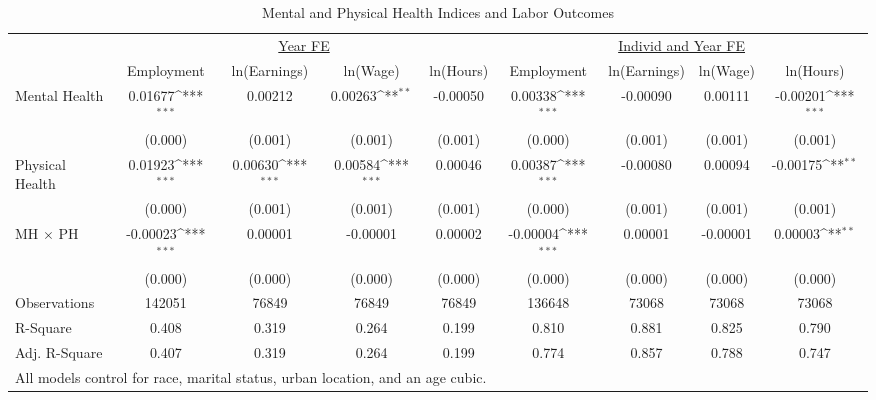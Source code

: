 \def\sym#1{\ifmmode^{#1}\else\(^{#1}\)\fi}
\begin{table}
\center\caption*{Mental and Physical Health Indices and Labor Outcomes}
\footnotesize
\begin{tabular}{l*{8}{c}}
                    &\multicolumn{4}{c}{\underline{Year FE}}                                                &\multicolumn{4}{c}{\underline{Individ and Year FE}}                                    \\\cmidrule(lr){2-5}\cmidrule(lr){6-9}
                    &\multicolumn{1}{c}{Employment}&\multicolumn{1}{c}{ln(Earnings)}&\multicolumn{1}{c}{ln(Wage)}&\multicolumn{1}{c}{ln(Hours)}&\multicolumn{1}{c}{Employment}&\multicolumn{1}{c}{ln(Earnings)}&\multicolumn{1}{c}{ln(Wage)}&\multicolumn{1}{c}{ln(Hours)}\\
\midrule
Mental Health       &     0.01677\sym{***}&     0.00212         &     0.00263\sym{**} &    -0.00050         &     0.00338\sym{***}&    -0.00090         &     0.00111         &    -0.00201\sym{***}\\
                    &     (0.000)         &     (0.001)         &     (0.001)         &     (0.001)         &     (0.000)         &     (0.001)         &     (0.001)         &     (0.001)         \\
Physical Health     &     0.01923\sym{***}&     0.00630\sym{***}&     0.00584\sym{***}&     0.00046         &     0.00387\sym{***}&    -0.00080         &     0.00094         &    -0.00175\sym{**} \\
                    &     (0.000)         &     (0.001)         &     (0.001)         &     (0.001)         &     (0.000)         &     (0.001)         &     (0.001)         &     (0.001)         \\
MH $\times$ PH      &    -0.00023\sym{***}&     0.00001         &    -0.00001         &     0.00002         &    -0.00004\sym{***}&     0.00001         &    -0.00001         &     0.00003\sym{**} \\
                    &     (0.000)         &     (0.000)         &     (0.000)         &     (0.000)         &     (0.000)         &     (0.000)         &     (0.000)         &     (0.000)         \\
\midrule
Observations        &      142051         &       76849         &       76849         &       76849         &      136648         &       73068         &       73068         &       73068         \\
R-Square            &       0.408         &       0.319         &       0.264         &       0.199         &       0.810         &       0.881         &       0.825         &       0.790         \\
Adj. R-Square       &       0.407         &       0.319         &       0.264         &       0.199         &       0.774         &       0.857         &       0.788         &       0.747         \\
\bottomrule
\multicolumn{9}{l}{\small{All models control for race, marital status, urban location, and an age cubic.}} \\
\end{tabular}
\end{table}
